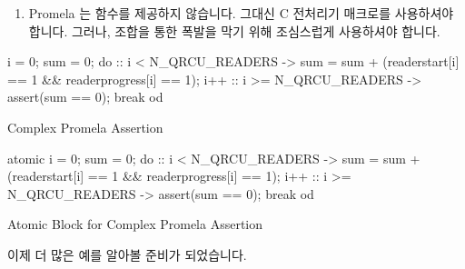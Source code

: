 \begin{enumerate}
\item	Promela 는 함수를 제공하지 않습니다.
	그대신 C 전처리기 매크로를 사용하셔야 합니다.
	그러나, 조합을 통한 폭발을 막기 위해 조심스럽게 사용하셔야 합니다.

\iffalse

\item	State reduction.  If you have complex assertions, evaluate
	them under \co{atomic}.  After all, they are not part of the
	algorithm.  One example of a complex assertion (to be discussed
	in more detail later) is as shown in
	Listing~\ref{lst:formal:Complex Promela Assertion}.

	There is no reason to evaluate this assertion
	non-atomically, since it is not actually part of the algorithm.
	Because each statement contributes to state, we can reduce
	the number of useless states by enclosing it in an \co{atomic}
	block as shown in
	Listing~\ref{lst:formal:Atomic Block for Complex Promela Assertion}.

\item	Promela does not provide functions.
	You must instead use C preprocessor macros.
	However, you must use them carefully in order to avoid
	combinatorial explosion.

\fi

\end{enumerate}

\begin{listing}[tbp]
\begin{VerbatimL}
i = 0;
sum = 0;
do
:: i < N_QRCU_READERS ->
	sum = sum + (readerstart[i] == 1 &&
	             readerprogress[i] == 1);
	i++
:: i >= N_QRCU_READERS ->
	assert(sum == 0);
	break
od
\end{VerbatimL}
\caption{Complex Promela Assertion}
\label{lst:formal:Complex Promela Assertion}
\end{listing}

\begin{listing}[tbp]
\begin{VerbatimL}
atomic {
	i = 0;
	sum = 0;
	do
	:: i < N_QRCU_READERS ->
		sum = sum + (readerstart[i] == 1 &&
		             readerprogress[i] == 1);
		i++
	:: i >= N_QRCU_READERS ->
		assert(sum == 0);
		break
	od
}
\end{VerbatimL}
\caption{Atomic Block for Complex Promela Assertion}
\label{lst:formal:Atomic Block for Complex Promela Assertion}
\end{listing}

이제 더 많은 예를 알아볼 준비가 되었습니다.

